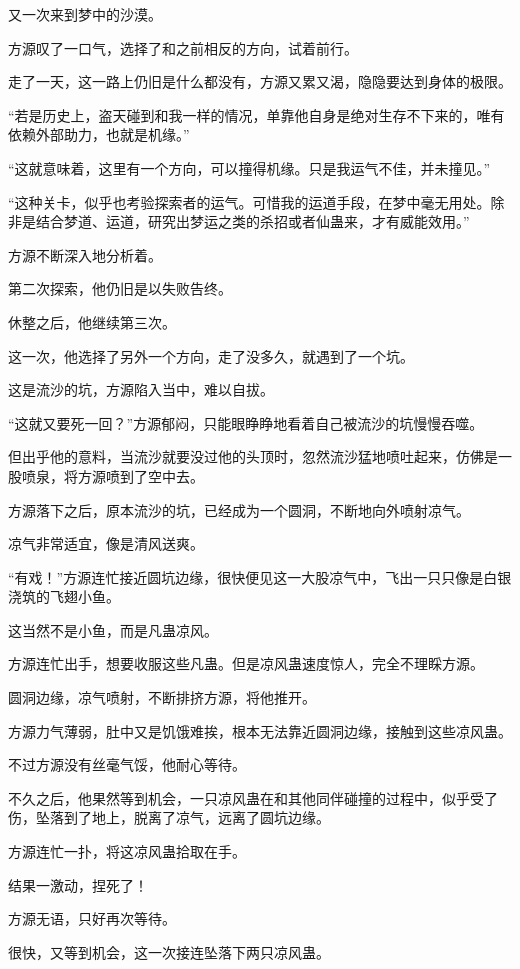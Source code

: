 \begin{this_body}
又一次来到梦中的沙漠。

方源叹了一口气，选择了和之前相反的方向，试着前行。

走了一天，这一路上仍旧是什么都没有，方源又累又渴，隐隐要达到身体的极限。

“若是历史上，盗天碰到和我一样的情况，单靠他自身是绝对生存不下来的，唯有依赖外部助力，也就是机缘。”

“这就意味着，这里有一个方向，可以撞得机缘。只是我运气不佳，并未撞见。”

“这种关卡，似乎也考验探索者的运气。可惜我的运道手段，在梦中毫无用处。除非是结合梦道、运道，研究出梦运之类的杀招或者仙蛊来，才有威能效用。”

方源不断深入地分析着。

第二次探索，他仍旧是以失败告终。

休整之后，他继续第三次。

这一次，他选择了另外一个方向，走了没多久，就遇到了一个坑。

这是流沙的坑，方源陷入当中，难以自拔。

“这就又要死一回？”方源郁闷，只能眼睁睁地看着自己被流沙的坑慢慢吞噬。

但出乎他的意料，当流沙就要没过他的头顶时，忽然流沙猛地喷吐起来，仿佛是一股喷泉，将方源喷到了空中去。

方源落下之后，原本流沙的坑，已经成为一个圆洞，不断地向外喷射凉气。

凉气非常适宜，像是清风送爽。

“有戏！”方源连忙接近圆坑边缘，很快便见这一大股凉气中，飞出一只只像是白银浇筑的飞翅小鱼。

这当然不是小鱼，而是凡蛊凉风。

方源连忙出手，想要收服这些凡蛊。但是凉风蛊速度惊人，完全不理睬方源。

圆洞边缘，凉气喷射，不断排挤方源，将他推开。

方源力气薄弱，肚中又是饥饿难挨，根本无法靠近圆洞边缘，接触到这些凉风蛊。

不过方源没有丝毫气馁，他耐心等待。

不久之后，他果然等到机会，一只凉风蛊在和其他同伴碰撞的过程中，似乎受了伤，坠落到了地上，脱离了凉气，远离了圆坑边缘。

方源连忙一扑，将这凉风蛊拾取在手。

结果一激动，捏死了！

方源无语，只好再次等待。

很快，又等到机会，这一次接连坠落下两只凉风蛊。


\end{this_body}
